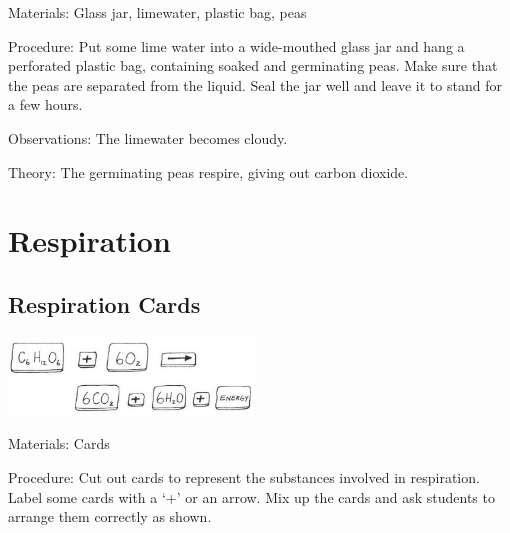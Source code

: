 \begin{multicols}{2}
\begin{description*}
\item[Materials:]{Glass jar, limewater, plastic bag, peas}
\item[Procedure:]{Put some lime water into a wide-mouthed glass jar and hang a perforated plastic bag,
containing soaked and germinating peas. Make sure that the peas are separated from the
liquid. Seal the jar well and leave it to stand for a few hours.}
\item[Observations:]{The limewater becomes cloudy.}
\item[Theory:]{The germinating peas respire, giving out carbon dioxide.}
\end{description*}

\columnbreak


\section*{Respiration}


\subsection{Respiration Cards} %

\begin{center}
\includegraphics[width=0.49\textwidth]{./img/vso/respiration-cards.jpg}
\end{center}

\begin{description*}
\item[Materials:]{Cards}
\item[Procedure:]{Cut out cards to represent the substances involved in respiration. Label
some cards with a `+' or an arrow. Mix up the cards and ask students to
arrange them correctly as shown.}
\end{description*}


\end{multicols}
